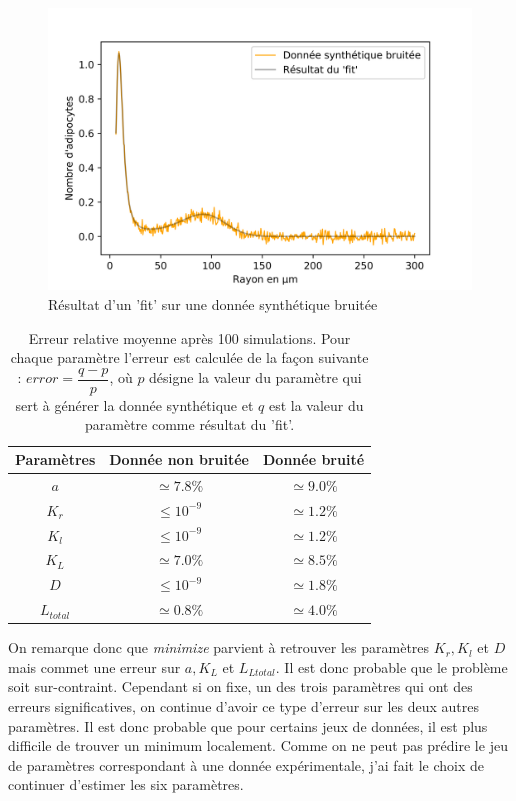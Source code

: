 \documentclass[a4paper,fleqn,leqno]{article}
\begin{document}
\begin{figure}[H]
\centering
\includegraphics[scale=0.8]{fit_exemple}
\caption{Résultat d'un 'fit' sur une donnée synthétique bruitée}
\label{figure:3}
\end{figure}

\begin{table}[H]
\centering
\begin{tabular}{|c|c|c|}
\hline
Paramètres   & Donnée non bruitée & Donnée bruité\\
\hline
$a$         & $\simeq 7.8\%$ & $\simeq 9.0\%$\\
$K_r$       & $\leq 10^{-9}$ & $\simeq 1.2\%$\\
$K_l$       & $\leq 10^{-9}$ & $\simeq 1.2\%$\\
$K_L$       & $\simeq 7.0\%$ & $\simeq 8.5\%$\\
$D$         & $\leq 10^{-9}$ & $\simeq 1.8\%$\\
$L_{total}$ & $\simeq 0.8\%$ & $\simeq 4.0\%$\\
\hline
\end{tabular}
\caption{Erreur relative moyenne après 100 simulations. Pour chaque paramètre l'erreur est calculée de la façon suivante : $error = \dfrac{q-p}{p}$, où $p$ désigne la valeur du paramètre qui sert à générer la donnée synthétique et $q$ est la valeur du paramètre comme résultat du 'fit'.} 
\label{table : 1}
\end{table}

On remarque donc que \textit{minimize} parvient à retrouver les paramètres $K_r, K_l$ et $D$ mais commet une erreur sur $a, K_L$ et $L_{Ltotal}$. Il est donc probable que le problème soit sur-contraint. Cependant si on fixe, un des trois paramètres qui ont des erreurs significatives, on continue d'avoir ce type d'erreur sur les deux autres paramètres. Il est donc probable que pour certains jeux de données, il est plus difficile de trouver un minimum localement. Comme on ne peut pas prédire le jeu de paramètres correspondant à une donnée expérimentale, j'ai fait le choix de continuer d'estimer les six paramètres.
\end{document}
